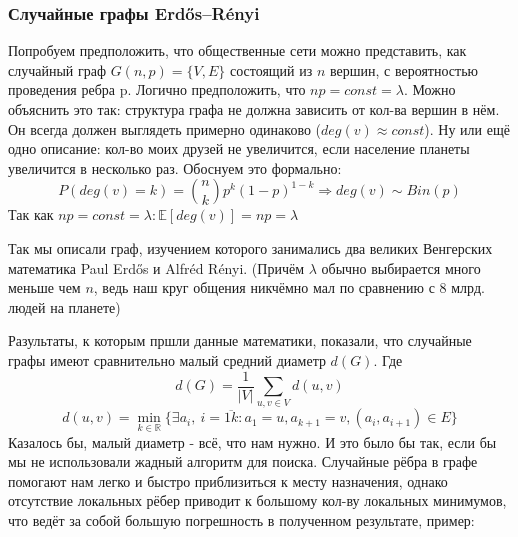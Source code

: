 \subsubsection{Случайные графы Erdős–Rényi}
Попробуем предположить, что общественные сети можно
представить, как случайный граф $G(n, p) = \{V, E\}$ состоящий из $n$ вершин, с
вероятностью проведения ребра p. Логично предположить, что $np = const = \lambda$.
Можно объяснить это так: структура графа не должна зависить от кол-ва
вершин в нём. Он всегда должен выглядеть примерно одинаково ($deg(v) \approx const$). Ну или ещё
одно описание: кол-во моих друзей не увеличится, если население планеты 
увеличится в несколько раз. Обоснуем это формально:
\begin{equation}
    P(deg(v) = k) = \binom{n}{k}p^k(1-p)^{1-k}
    \Rightarrow deg(v) \sim Bin(p)
\end{equation}
Так как $np = const = \lambda : \mathbb{E}[deg(v)] = np = \lambda$

Так мы описали граф, изучением которого занимались
два великих Венгерских мате\-матика Paul Erdős и Alfréd Rényi. (Причём $\lambda$ обычно
выбирается много меньше чем $n$, ведь наш круг общения никчёмно мал по сравнению с 8 млрд. людей на
планете) 

Разультаты, к которым пршли данные математики, показали, что случайные графы имеют 
сравнительно малый средний диаметр $d(G)$. Где
\begin{equation}
    d(G) = \frac{1}{|V|}\sum_{u, v \in V}d(u, v)
\end{equation}
\begin{equation}
    d(u, v) = \min_{k \in \mathbb{R}}\{\exists a_i, \ i = \overline{1k}  : a_1 = u, a_{k + 1} = v, (a_i, a_{i + 1}) \in E\}
\end{equation}
Казалось бы, малый диаметр - всё, что нам нужно. И это было бы так, если бы мы не 
использовали жадный алгоритм для поиска. Случайные рёбра в графе помогают 
нам легко и быстро приблизиться к месту назначения, однако отсутствие локальных
рёбер приводит к большому кол-ву локальных минимумов, что ведёт за собой большую
погрешность в полученном результате, пример:

